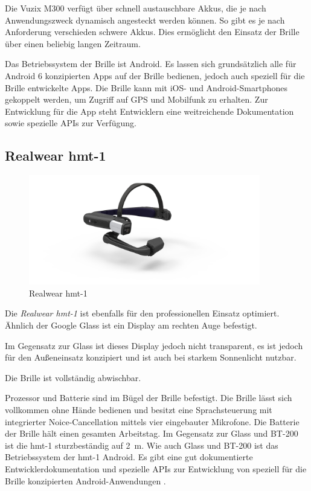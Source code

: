 Die Vuzix M300 verfügt über schnell austauschbare Akkus, die je nach Anwendungszweck dynamisch angesteckt werden können. So gibt es je nach Anforderung verschieden schwere Akkus. Dies ermöglicht den Einsatz der Brille über einen beliebig langen Zeitraum.

Das Betriebssystem der Brille ist Android. Es lassen sich grundsätzlich alle für Android 6 konzipierten Apps auf der Brille bedienen, jedoch auch speziell für die Brille entwickelte Apps. Die Brille kann mit iOS- und Android-Smartphones gekoppelt werden, um Zugriff auf GPS und Mobilfunk zu erhalten. Zur Entwicklung für die App steht Entwicklern eine weitreichende Dokumentation sowie spezielle APIs zur Verfügung. \cite{Vuzix2018}
%
%
%
%
%
%
\subsection{Realwear hmt-1}
\label{sec:Realwear_hmt-1}
%
\begin{figure}[htbp]
    \centering
    \includegraphics[width=0.9\textwidth]{data/bilder/HMT_1.jpg}
    \caption{Realwear hmt-1 \cite{Wire2017}}
    \label{fig:hmt1}
\end{figure}
%
Die \emph{Realwear hmt-1} ist ebenfalls für den professionellen Einsatz optimiert. Ähnlich der Google Glass ist ein Display am rechten Auge befestigt. 

Im Gegensatz zur Glass ist dieses Display jedoch nicht transparent, es ist jedoch für den Außeneinsatz konzipiert und ist auch bei starkem Sonnenlicht nutzbar.

Die Brille ist vollständig abwischbar.

Prozessor und Batterie sind im Bügel der Brille befestigt. Die Brille lässt sich vollkommen ohne Hände bedienen und besitzt eine Sprachsteuerung mit integrierter Noice-Cancellation mittels vier eingebauter Mikrofone. Die Batterie der Brille hält einen gesamten Arbeitstag. Im Gegensatz zur Glass und BT-200 ist die hmt-1 sturzbeständig auf 2~m. Wie auch Glass und BT-200 ist das Betriebssystem der hmt-1 Android. Es gibt eine gut dokumentierte Entwicklerdokumentation und spezielle APIs zur Entwicklung von speziell für die Brille konzipierten Android-Anwendungen \cite{Realwear2018}.